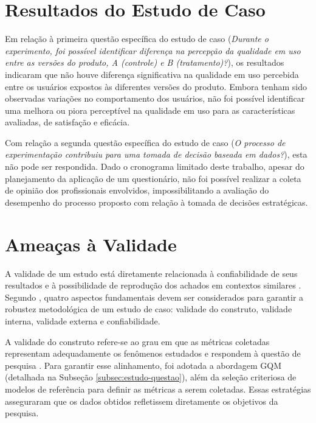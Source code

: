 \section{Resultados do Estudo de Caso}
\label{ch:resultados-estudo}

Em relação à primeira questão específica do estudo de caso (\textit{Durante o experimento, foi possível identificar diferença na percepção da qualidade em uso entre as versões do produto, A (controle) e B (tratamento)?}), os resultados indicaram que não houve diferença significativa na qualidade em uso percebida entre os usuários expostos às diferentes versões do produto. Embora tenham sido observadas variações no comportamento dos usuários, não foi possível identificar uma melhora ou piora perceptível na qualidade em uso para as características avaliadas, de satisfação e eficácia.

Com relação a segunda questão específica do estudo de caso (\textit{O processo de experimentação contribuiu para uma tomada de decisão baseada em dados?}), esta não pode ser respondida. Dado o cronograma limitado deste trabalho, apesar do planejamento da aplicação de um questionário, não foi possível realizar a coleta de opinião dos profissionais envolvidos, impossibilitando a avaliação do desempenho do processo proposto com relação à tomada de decisões estratégicas.



\section{Ameaças à Validade}

A validade de um estudo está diretamente relacionada à confiabilidade de seus resultados e à possibilidade de reprodução dos achados em contextos similares \cite{wohlin_experimentation_2012}. Segundo , quatro aspectos fundamentais devem ser considerados para garantir a robustez metodológica de um estudo de caso: validade do construto, validade interna, validade externa e confiabilidade.

A validade do construto refere-se ao grau em que as métricas coletadas representam adequadamente os fenômenos estudados e respondem à questão de pesquisa \cite{wohlin_experimentation_2012}. Para garantir esse alinhamento, foi adotada a abordagem GQM (detalhada na Subseção \ref{subsec:estudo-questao}), além da seleção criteriosa de modelos de referência para definir as métricas a serem coletadas. Essas estratégias asseguraram que os dados obtidos refletissem diretamente os objetivos da pesquisa.


